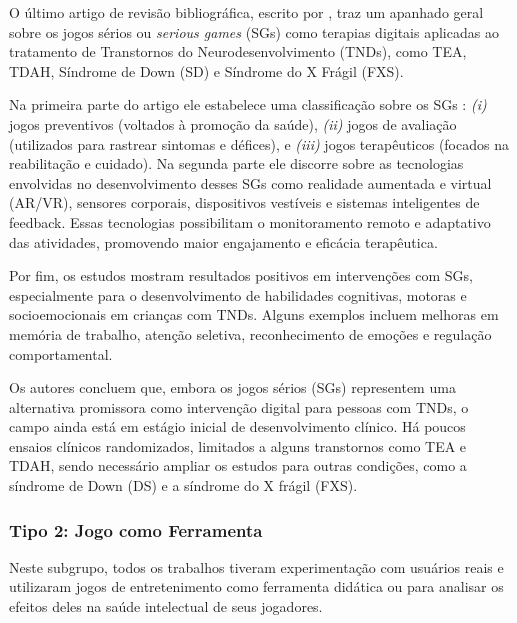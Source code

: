 O último artigo de revisão bibliográfica, escrito por \cite{Vacca2023}, traz um apanhado geral sobre os jogos sérios ou \textit{serious games} (SGs) como terapias digitais aplicadas ao tratamento de Transtornos do Neurodesenvolvimento (TNDs), como TEA, TDAH, Síndrome de Down (SD) e Síndrome do X Frágil (FXS).

Na primeira parte do artigo ele estabelece uma classificação sobre os SGs : \textit{(i)} jogos preventivos (voltados à promoção da saúde), \textit{(ii)} jogos de avaliação (utilizados para rastrear sintomas e défices), e \textit{(iii)} jogos terapêuticos (focados na reabilitação e cuidado). Na segunda parte ele discorre sobre as tecnologias envolvidas  no desenvolvimento desses SGs como realidade aumentada e virtual (AR/VR), sensores corporais, dispositivos vestíveis e sistemas inteligentes de feedback. Essas tecnologias possibilitam o monitoramento remoto e adaptativo das atividades, promovendo maior engajamento e eficácia terapêutica.

Por fim, os estudos mostram resultados positivos em intervenções com SGs, especialmente para o desenvolvimento de habilidades cognitivas, motoras e socioemocionais em crianças com TNDs. Alguns exemplos incluem melhoras em memória de trabalho, atenção seletiva, reconhecimento de emoções e regulação comportamental.

Os autores concluem que, embora os jogos sérios (SGs) representem uma alternativa promissora como intervenção digital para pessoas com TNDs, o campo ainda está em estágio inicial de desenvolvimento clínico. Há poucos ensaios clínicos randomizados, limitados a alguns transtornos como TEA e TDAH, sendo necessário ampliar os estudos para outras condições, como a síndrome de Down (DS) e a síndrome do X frágil (FXS).

\subsubsection{Tipo 2: Jogo como Ferramenta}
Neste subgrupo, todos os trabalhos tiveram experimentação com usuários reais e utilizaram jogos de entretenimento como ferramenta didática ou para analisar os efeitos deles na saúde intelectual de seus jogadores.



